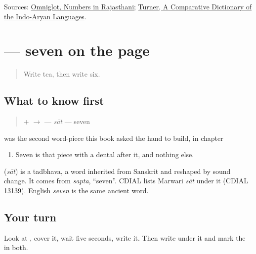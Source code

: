 \begin{tcolorbox}[breakable,colback=teal!4,colframe=teal!35!black,title={Before you move on}]
Sources: \href{https://www.omniglot.com/language/numbers/rajasthani.htm}{Omniglot, Numbers in Rajasthani}; \href{https://dsal.uchicago.edu/dictionaries/soas/}{Turner, A Comparative Dictionary of the Indo-Aryan Languages}.
\end{tcolorbox}
\section[\texorpdfstring{\mw{सात} (sāt)}{सात (sāt)}]{ — seven on the page}

\label{lesson:MW-C33-saat}



\begin{quote}
Write tea, then write six.
\end{quote}

\subsection*{What to know first}
\begin{quote}
\textbf{} + \textbf{} $\to$ \textbf{} — \emph{sāt} — seven
\end{quote}

\textbf{} was the second word-piece this book asked the hand to build, in chapter

\begin{enumerate}
\raggedright
  \item Seven is that piece with a dental \textbf{} after it, and nothing else.
\end{enumerate}

\begin{cousinweb}
\textbf{} (\emph{sāt}) is a tadbhava, a word inherited from Sanskrit and reshaped by sound change. It comes from \emph{sapta}, \textquotedblleft{}seven\textquotedblright{}. CDIAL lists Marwari \emph{sāt} under it (CDIAL 13139). English \emph{seven} is the same ancient word.
\end{cousinweb}

\subsection*{Your turn}
Look at \textbf{}, cover it, wait five seconds, write it. Then write \textbf{} under it and mark the \textbf{} in both.

